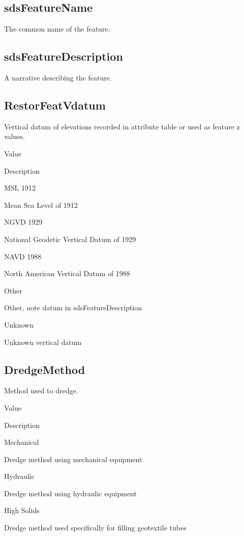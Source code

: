 \documentclass[
  letterpaper,
  DIV=11,
  numbers=noendperiod]{scrreprt}
\begin{document}
\subsection{sdsFeatureName}\label{sdsfeaturename}

The common name of the feature.

\subsection{sdsFeatureDescription}\label{sdsfeaturedescription}

A narrative describing the feature.

\subsection{RestorFeatVdatum}\label{restorfeatvdatum}

Vertical datum of elevations recorded in attribute table or used as
feature z values.

Value

Description

MSL 1912

Mean Sea Level of 1912

NGVD 1929

National Geodetic Vertical Datum of 1929

NAVD 1988

North American Vertical Datum of 1988

Other

Other, note datum in sdsFeatureDescription

Unknown

Unknown vertical datum

\subsection{DredgeMethod}\label{dredgemethod}

Method used to dredge.

Value

Description

Mechanical

Dredge method using mechanical equipment

Hydraulic

Dredge method using hydraulic equipment

High Solids

Dredge method used specifically for filling geotextile tubes
\end{document}

